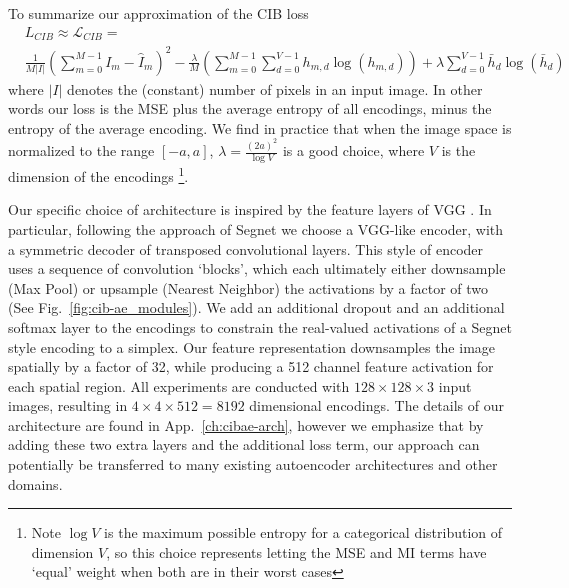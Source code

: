 To summarize our approximation of the CIB loss
\begin{equation}
\begin{split}
& L_{CIB} \approx \mathcal{L}_{CIB} =\\
&  \frac{1}{M |I|} \left( \sum_{m=0}^{M-1} I_m - \hat{I}_m \right)^2
- \frac{\lambda}{M} \left( \sum_{m=0}^{M-1} \sum_{d=0}^{V-1} h_{m,d}\log(h_{m,d}) \right)
+ \lambda \sum_{d=0}^{V-1} \bar{h}_{d}\log(\bar{h}_{d})
\end{split}
\end{equation}
where $|I|$ denotes the (constant) number of pixels in an input image. In other words our loss is the MSE plus the average entropy of all encodings, minus the entropy of the average encoding. We find in practice that when the image space is normalized to the range $[-a,a]$, $\lambda = \frac{(2a)^2}{\log V}$ is a good choice, where $V$ is the dimension of the encodings \footnote{Note $\log V$ is the maximum possible entropy for a categorical distribution of dimension $V$, so this choice represents letting the MSE and MI terms have `equal' weight when both are in their worst cases}.

Our specific choice of architecture is inspired by the feature layers of VGG \citep{Simonyan14c}. In particular, following the approach of Segnet \citep{BadrinarayananK15} we choose a VGG-like encoder, with a symmetric decoder of transposed convolutional layers. This style of encoder uses a sequence of convolution `blocks', which each ultimately either downsample (Max Pool) or upsample (Nearest Neighbor) the activations by a factor of two (See Fig.~\ref{fig:cib-ae_modules}). We add an additional dropout and an additional softmax layer to the encodings to constrain the real-valued activations of a Segnet style encoding to a simplex. Our feature representation downsamples the image spatially by a factor of 32, while producing a 512 channel feature activation for each spatial region. All experiments are conducted with $128 \times 128 \times 3$ input images, resulting in $4 \times 4 \times 512 = 8192$ dimensional encodings. The details of our architecture are found in App.~\ref{ch:cibae-arch}, however we emphasize that by adding these two extra layers and the additional loss term, our approach can potentially be transferred to many existing autoencoder architectures and other domains.

